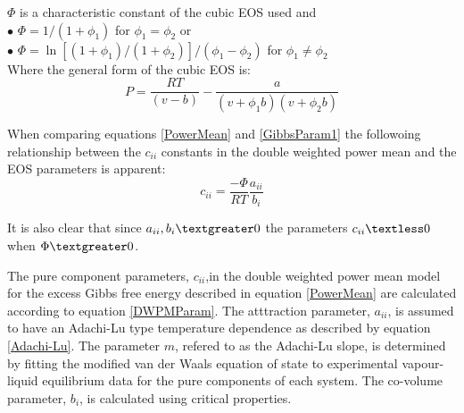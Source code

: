 				
				$\Phi$ is a characteristic constant of the cubic EOS used and\\
				$\bullet$ $\Phi = 1/\left(1+\phi_{1}\right)$ for $\phi_{1} = \phi_{2}$ or\\
				$\bullet$ $\Phi = \ln \left[\left(1+\phi_{1}\right)/\left(1+\phi_{2}\right)\right]/\left(\phi_{1} - \phi_{2}\right)$ for  $\phi_{1} \neq \phi_{2}$\\
				Where the general form of the cubic EOS is:
				\begin{equation}
					P = \frac{RT}{\left(v-b\right)} - \frac{a}{\left(v+\phi_{1}b\right)\left(v+\phi_{2}b\right)}
				\end{equation}
				
				When comparing equations \ref{PowerMean} and \ref{GibbsParam1} the followoing relationship between the $c_{ii}$ constants in the double weighted power mean and the EOS parameters is apparent:
				\begin{equation}
					c_{ii} = \frac{-\Phi}{RT} \frac{a_{ii}}{b_{i}} \label{DWPMParam}
				\end{equation}
				
				It is also clear that since $a_{ii}, b_{i} \textgreater 0$ the parameters $c_{ii}\textless 0$ when $\Phi\textgreater 0$.
								
	
The pure component parameters, $c_{ii}$,in the double weighted power mean model for the excess Gibbs free energy described in equation \ref{PowerMean} are calculated according to equation \ref{DWPMParam}. The atttraction parameter, $a_{ii}$, is assumed to have an Adachi-Lu type temperature dependence as described by equation \ref{Adachi-Lu}. The parameter $m$, refered to as the Adachi-Lu slope, is determined by fitting the modified van der Waals equation of state to experimental vapour-liquid equilibrium data for the pure components of each system. The co-volume parameter, $b_{i}$, is calculated using critical properties.\\
	
